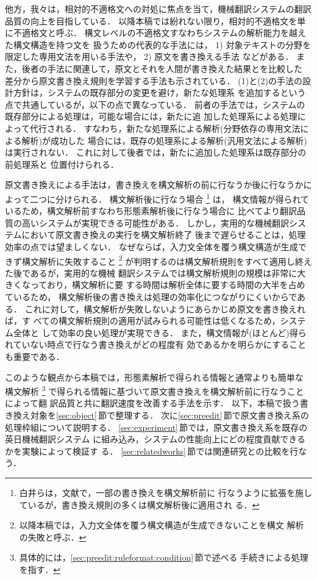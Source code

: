 他方，我々は，相対的不適格文への対処に焦点を当て，機械翻訳システムの翻訳
品質の向上を目指している．
以降本稿では紛れない限り，相対的不適格文を単に不適格文と呼ぶ．
構文レベルの不適格文すなわちシステムの解析能力を越えた構文構造を持つ文を
扱うための代表的な手法には，
1) 対象テキストの分野を限定した専用文法を用いる手法\cite{Aizawa96}や，
2) 原文を書き換える手法\cite{Kim94,Narita94,Sagawa94,Shirai95,KatoTerumasa97}
などがある．
また，後者の手法に関連して，原文とそれを人間が書き換えた結果とを比較した
差分から原文書き換え規則を学習する手法\cite{Yamaguchi98}も示されている．
(1)と(2)の手法の設計方針は，システムの既存部分の変更を避け，新たな処理系
を追加するという点で共通しているが，以下の点で異なっている．
前者の手法では，システムの既存部分による処理は，可能な場合には，新たに追
加した処理系による処理によって代行される．
すなわち，新たな処理系による解析(分野依存の専用文法による解析)が成功した
場合には，既存の処理系による解析(汎用文法による解析)は実行されない．
これに対して後者では，新たに追加した処理系は既存部分の前処理系と
位置付けられる．

原文書き換えによる手法は，書き換えを構文解析の前に行なうか後に行なうかに
よって二つに分けられる．
構文解析後に行なう場合\cite{Sagawa94,Shirai95}
\footnote{白井らは，文献\cite{Shirai98}で，一部の書き換えを構文解析前に
行なうように拡張を施しているが，書き換え規則の多くは構文解析後に適用され
る．}
は，
構文情報が得られているため，構文解析前すなわち形態素解析後に行なう場合に
比べてより翻訳品質の高いシステムが実現できる可能性がある．
しかし，実用的な機械翻訳システムにおいて原文書き換えの実行を構文解析終了
後まで遅らせることは，処理効率の点では望ましくない．
なぜならば，入力文全体を覆う構文構造が生成できず構文解析に失敗すること
\footnote{以降本稿では，入力文全体を覆う構文構造が生成できないことを構文
解析の失敗と呼ぶ．}
が判明するのは構文解析規則をすべて適用し終えた後であるが，実用的な機械
翻訳システムでは構文解析規則の規模は非常に大きくなっており，構文解析に要
する時間は解析全体に要する時間の大半を占めているため，
構文解析後の書き換えは処理の効率化につながりにくいからである．
これに対して，構文解析が失敗しないようにあらかじめ原文を書き換えれば，す
べての構文解析規則の適用が試みられる可能性は低くなるため，システム全体と
して効率の良い処理が実現できる．
また，構文情報が(ほとんど)得られていない時点で行なう書き換えがどの程度有
効であるかを明らかにすることも重要である．

このような観点から本稿では，形態素解析で得られる情報と通常よりも簡単な
構文解析
\footnote{具体的には，\ref{sec:preedit:ruleformat:condition}\,節で述べる
手続きによる処理を指す．}
で得られる情報に基づいて原文書き換えを構文解析前に行なうことによって翻
訳品質と共に翻訳速度を改善する手法を示す．
以下，本稿で扱う書き換え対象を\ref{sec:object}\,節で整理する．
次に\ref{sec:preedit}\,節で原文書き換え系の処理枠組について説明する．
\ref{sec:experiment}\,節では，原文書き換え系を既存の英日機械翻訳システム
に組み込み，システムの性能向上にどの程度貢献できるかを実験によって検証す
る．
\ref{sec:relatedworks}\,節では関連研究との比較を行なう．

